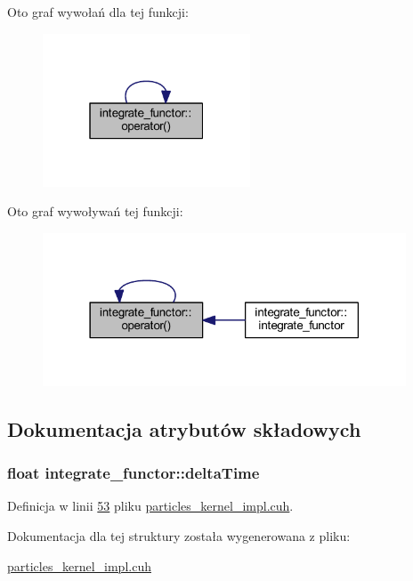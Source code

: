 Oto graf wywołań dla tej funkcji\-:\nopagebreak
\begin{figure}[H]
\begin{center}
\leavevmode
\includegraphics[width=175pt]{structintegrate__functor_a772e86ead8690332beb50911e4448f81_cgraph}
\end{center}
\end{figure}




Oto graf wywoływań tej funkcji\-:\nopagebreak
\begin{figure}[H]
\begin{center}
\leavevmode
\includegraphics[width=306pt]{structintegrate__functor_a772e86ead8690332beb50911e4448f81_icgraph}
\end{center}
\end{figure}




\subsection{Dokumentacja atrybutów składowych}
\hypertarget{structintegrate__functor_a06dce1826719cd5b2a9fdd9f566da754}{
\subsubsection[{delta\-Time}]{\setlength{\rightskip}{0pt plus 5cm}float integrate\-\_\-functor\-::delta\-Time}}\label{structintegrate__functor_a06dce1826719cd5b2a9fdd9f566da754}


Definicja w linii \hyperlink{particles__kernel__impl_8cuh_source_l00053}{53} pliku \hyperlink{particles__kernel__impl_8cuh_source}{particles\-\_\-kernel\-\_\-impl.\-cuh}.



Dokumentacja dla tej struktury została wygenerowana z pliku\-:\begin{DoxyCompactItemize}
\item 
\hyperlink{particles__kernel__impl_8cuh}{particles\-\_\-kernel\-\_\-impl.\-cuh}\end{DoxyCompactItemize}
